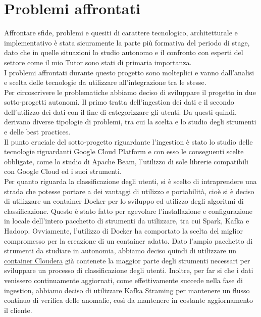 \section{Problemi affrontati}
Affrontare sfide, problemi e quesiti di carattere tecnologico, architetturale e implementativo è stata sicuramente la parte più formativa del periodo di stage, dato che in quelle situazioni lo studio autonomo e il confronto con esperti del settore come il mio Tutor sono stati di primaria importanza.
\\
I problemi affrontati durante questo progetto sono molteplici e vanno dall'analisi e scelta delle tecnologie da utilizzare all'integrazione tra le stesse.
\\
Per circoscrivere le problematiche abbiamo deciso di sviluppare il progetto in due sotto-progetti autonomi. 
Il primo tratta dell'ingestion dei dati e il secondo dell'utilizzo dei dati con il fine di categorizzare gli utenti. Da questi quindi, derivano diverse tipologie di problemi, tra cui la scelta e lo studio degli strumenti e delle \gls{best practices}.
\\
Il punto cruciale del sotto-progetto riguardante l'ingestion è stato lo studio delle tecnologie riguardanti Google Cloud Platform e con esso le conseguenti scelte obbligate, come lo studio di Apache Beam, l'utilizzo di sole librerie compatibili con Google Cloud ed i suoi strumenti.
\\
Per quanto riguarda la classificazione degli utenti, si è scelto di intraprendere una strada che potesse portare a dei vantaggi di utilizzo e portabilità, cioè si è deciso di utilizzare un \gls{container} Docker per lo sviluppo ed utilizzo degli algoritmi di classificazione.
Questo è stato fatto per agevolare l'installazione e configurazione in locale dell'intero pacchetto di strumenti da utilizzare, tra cui Spark, Kafka e Hadoop.
Ovviamente, l'utilizzo di Docker ha comportato la scelta del miglior compromesso per la creazione di un container adatto. Dato l'ampio pacchetto di strumenti da studiare in autonomia, abbiamo deciso quindi di utilizzare un \href{https://www.cloudera.com/documentation/enterprise/5-6-x/topics/quickstart_docker_container.html}{container Cloudera} già contenete la maggior parte degli strumenti necessari per sviluppare un processo di classificazione degli utenti.
Inoltre, per far si che i dati venissero continuamente aggiornati, come effettivamente succede nella fase di ingestion, abbiamo deciso di utilizzare Kafka Straming per mantenere un flusso continuo di verifica delle anomalie, così da mantenere in costante aggiornamento il cliente.

